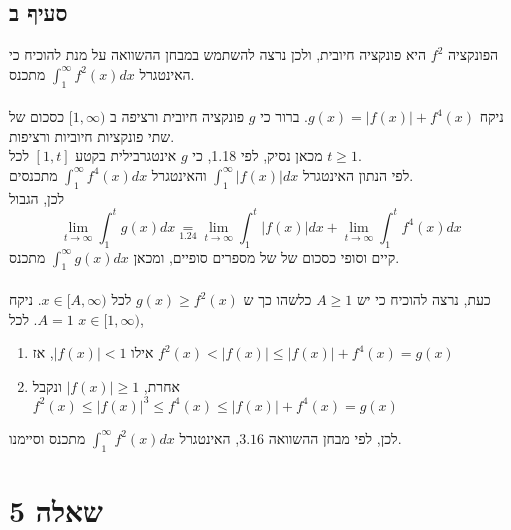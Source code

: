 \documentclass{article}
\newcommand\underrel[2]{\mathrel{\mathop{#2}\limits_{#1}}}
\begin{document}
\subsection*{סעיף ב}

הפונקציה $f^2$
היא פונקציה חיובית, ולכן נרצה להשתמש במבחן ההשוואה על מנת להוכיח כי
האינטגרל $\int_1^\infty f^2(x)dx$
מתכנס.
\\\\
ניקח $g(x)=|f(x)|+f^4(x)$.
ברור כי $g$ פונקציה חיובית ורציפה ב $[1,\infty)$ כסכום של שתי פונקציות חיוביות ורציפות. \\
מכאן נסיק, לפי 1.18, כי $g$ אינטגרבילית בקטע $[1,t]$ לכל $t\geq 1$. \\
לפי הנתון האינטגרל $\int_1^\infty |f(x)|dx$
והאינטגרל $\int_1^\infty f^4(x)dx$ מתכנסים.\\
לכן, הגבול
\[
    \lim_{t\rightarrow \infty}\int_1^t g(x)dx \underrel{1.24}{=}
    \lim_{t\rightarrow \infty}\int_1^t |f(x)|dx + \lim_{t\rightarrow \infty}\int_1^t f^4(x)dx
\]
קיים וסופי כסכום של של מספרים סופיים, ומכאן $\int_1^\infty g(x)dx$ מתכנס.
\\\\
כעת, נרצה להוכיח כי יש $A\geq 1$
כלשהו כך ש $g(x)\geq f^2(x)$
לכל $x\in[A,\infty)$.
ניקח $A=1$. לכל $x\in[1,\infty)$,

\begin{enumerate}[I]
    \item אילו $|f(x)|<1$,
          אז $f^2(x)<|f(x)|\leq |f(x)|+f^4(x)=g(x)$
    \item אחרת, $|f(x)|\geq 1$
          ונקבל $f^2(x)\leq|f(x)|^3\leq f^4(x)\leq |f(x)|+f^4(x)=g(x)$
\end{enumerate}
לכן, לפי מבחן ההשוואה $3.16$,
האינטגרל $\int_1^\infty f^2(x)dx$
מתכנס וסיימנו.

\pagebreak

\section*{שאלה 5}
\end{document}

